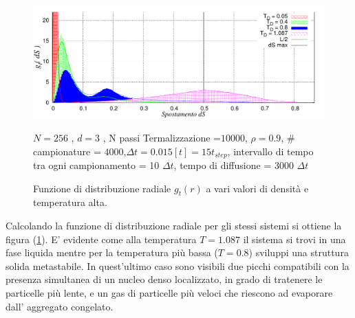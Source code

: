 	\begin{figure}[htbp]
		\centering
		\caption[Sfere Soffici$/$Problema11$\_$v2C.cpp]{Funzione di distribuzione radiale $g_t(r)$ a vari valori di densità e temperatura alta.}\label{fig: Problema11_v2C}\vspace{-15pt}

		\includegraphics[scale=0.95]{Immagini/Soffici/DistrodS_RhoAlta_3D}
		
		\centering  \footnotesize{$N= 256$ , $d=3$ , N passi Termalizzazione =$ 10000$, $\rho = 0.9$, $\#$ campionature = $ 4000$,\newline $\Delta t = 0.015 [t] = 15 t_{step}$, intervallo di tempo tra ogni campionamento = 10 $\Delta t$, tempo di diffusione = 3000 $\Delta t$}
	\end{figure}
Calcolando la funzione di distribuzione radiale  per gli stessi sistemi si ottiene la figura (\ref{fig: Problema11_v2C}). E' evidente come alla temperatura $T=1.087$ il sistema si trovi in una fase liquida  mentre per la temperatura più bassa ($T=0.8$) sviluppi una struttura solida metastabile. In quest'ultimo caso sono visibili due picchi compatibili con la presenza simultanea di un nucleo denso localizzato, in grado di tratenere le particelle più lente, e un gas di particelle più veloci che riescono ad evaporare dall' aggregato congelato.
\medskip

